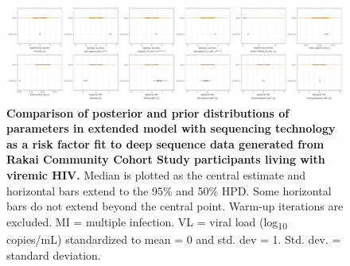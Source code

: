 \documentclass[10pt,letterpaper]{article}
\begin{document}
\begin{figure}[!ht]
 \includegraphics[width=1\textwidth]{../../figures/empirical_sexpever_men_prior.pdf}
\caption{{\bf Comparison of posterior and prior distributions of parameters in extended model with sequencing technology as a risk factor fit to deep sequence data generated from  Rakai Community Cohort Study participants living with viremic HIV.} Median is plotted as the central estimate and horizontal bars extend to the 95\% and 50\% HPD. Some horizontal bars do not extend beyond the central point. Warm-up iterations are excluded. MI = multiple infection. VL = viral load (log\textsubscript{10} copies/mL) standardized to mean = 0 and std. dev = 1. Std. dev. = standard deviation. }
\end{figure}
\end{document}
